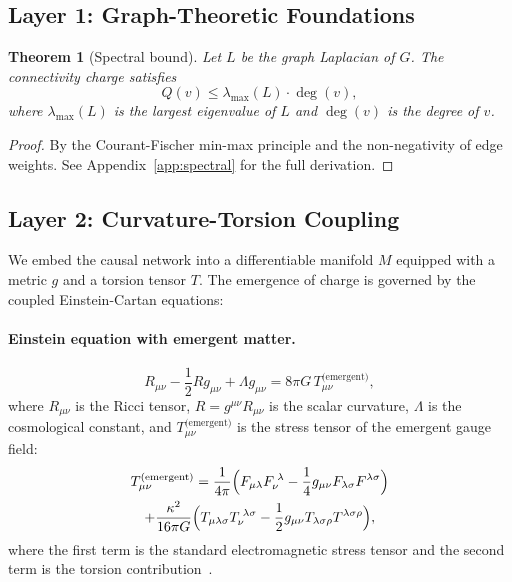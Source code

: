 \documentclass[11pt,a4paper]{article}
\newtheorem{theorem}{Theorem}[section]
\theoremstyle{definition}
\theoremstyle{remark}
\newcommand{\Tem}{T^{\text{(emergent)}}}
\begin{document}
\subsection{Layer 1: Graph-Theoretic Foundations}\label{subsec:layer1}

\begin{theorem}[Spectral bound]\label{thm:spectral}
Let $L$ be the graph Laplacian of $G$. The connectivity charge satisfies
\begin{equation}
Q(v) \leq \lambda_{\max}(L) \cdot \deg(v),
\end{equation}
where $\lambda_{\max}(L)$ is the largest eigenvalue of $L$ and $\deg(v)$ is the
degree of $v$.
\end{theorem}

\begin{proof}
By the Courant-Fischer min-max principle and the non-negativity of edge
weights. See Appendix~\ref{app:spectral} for the full derivation.
\end{proof}

\subsection{Layer 2: Curvature-Torsion Coupling}\label{subsec:layer2}

We embed the causal network into a differentiable manifold $M$ equipped with a
metric $g$ and a torsion tensor $T$. The emergence of charge is governed by the
coupled Einstein-Cartan equations:

\paragraph{Einstein equation with emergent matter.}
\begin{equation}\label{eq:einstein}
R_{\mu\nu} - \frac{1}{2} R g_{\mu\nu} + \Lambda g_{\mu\nu}
= 8\pi G \, \Tem_{\mu\nu},
\end{equation}
where $R_{\mu\nu}$ is the Ricci tensor, $R = g^{\mu\nu} R_{\mu\nu}$ is the
scalar curvature, $\Lambda$ is the cosmological constant, and
$\Tem_{\mu\nu}$ is the stress tensor of the emergent gauge field:
\begin{multline}\label{eq:Tem}
\Tem_{\mu\nu} = \frac{1}{4\pi}
\Bigl( F_{\mu\lambda} F_{\nu}^{\;\lambda}
- \frac{1}{4} g_{\mu\nu} F_{\lambda\sigma} F^{\lambda\sigma} \Bigr) \\
+ \frac{\kappa^{2}}{16\pi G}
\Bigl( T_{\mu\lambda\sigma} T_{\nu}^{\;\lambda\sigma}
- \frac{1}{2} g_{\mu\nu} T_{\lambda\sigma\rho} T^{\lambda\sigma\rho} \Bigr),
\end{multline}
where the first term is the standard electromagnetic stress tensor and the
second term is the torsion contribution~\cite{Hehl1976}.
\end{document}
